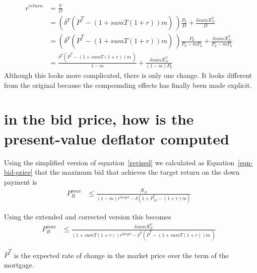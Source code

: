\begin{align}
r^{return} 
  &= \frac{V}{D}  \nonumber \\
  &= \left(\delta^T \left(\dot P^T - (1 + sumT(1+r))m\right) \ \right) \frac{P_0}{D}  + \frac{\delta sum\mathcal{R}^w_N}{D}      \nonumber \\
  &= \left(\delta^T \left(\dot P^T - (1 + sumT(1+r))m \right) \ \right)\frac{P_0}{P_0-mP_0} +  \frac{\delta sum\mathcal{R}^w_N }{P_0-mP_0}  \\ 
  &= \frac{\delta^T \left(\dot P^T - (1 + sumT(1+r))m\ \right) }{1-m} +\frac{\delta sum\mathcal{R}^w_N }{(1-m)P_0}\label{revised}
\end{align}
Although this looks more complicated, there is only one change. It looks different from the original because the compounding effects has finally been made explicit.



\section{in the bid price, how is the present-value deflator computed}

Using the simplified version of equation~\ref{revised} we calculated  as Equation~\ref{eqn-bid-price} that the maximum bid that achieves the target return on the down payment is
\begin{align*}
P_B^{max} & \le    \frac{\mathcal{R}_N}{(1-m)r^{target}-\delta \left(1 + \dot P_M^e - (1+r)m\right)}  \end{align*}

Using the extended and corrected version this becomes
\begin{align}
P_B^{max} & \le    \frac{\delta sum\mathcal{R}^w_N } {(1 + sumT(1+r))r^{target}-\delta^T \left(\dot P^T - (1 + sumT(1+r))m\ \right)} \label{eqn-bid-revised} \end{align}

$\dot P^T$  is the expected rate of change in the market price over the term of the mortgage.